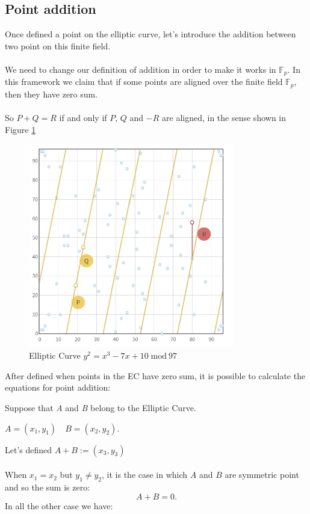 \subsection{Point addition}
Once defined a point on the elliptic curve, let's introduce the addition between two point on this finite field.
\\ \\
We need to change our definition of addition in order to make it works in $\mathbb{F}_p$. In this framework we claim that if some points are aligned over the finite field $\mathbb{F}_p$, then they have zero sum.
\\ \\
So $P+Q=R$ if and only if $P$, $Q$ and $-R$ are aligned, in the sense shown in Figure \ref{fig:EC_aligned}
\begin{figure}[ht!]
	\centering
	\includegraphics[width=9cm]{Figures/EC_aligned.jpg}
	\caption{Elliptic Curve $y^2=x^3-7x+10 \; \textrm{mod} \ 97$}
	\label{fig:EC_aligned}
\end{figure}

\begin{flushleft}
	After defined when points in the EC have zero sum, it is possible to calculate the equations for point addition:
\end{flushleft}
Suppose that \textit{A} and \textit{B} belong to the Elliptic Curve.

\begin{center}
	$ A=(x_1,y_1) \quad B=(x_2,y_2)$.
\end{center}
Let's defined $ A+B :=(x_3,y_3) $ 
\\ \\
When $x_1=x_2$ but $y_1 \neq y_2$, it is the case in which $A$ and $B$ are symmetric point and so the sum is zero: 
\begin{equation*}
A+B=0 .
\end{equation*}
In all the other case we have:



